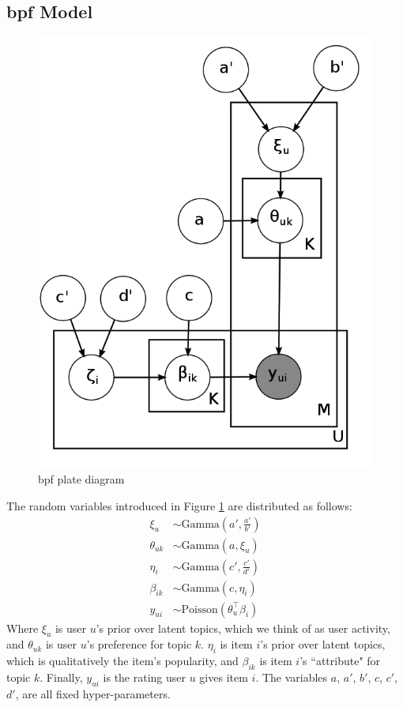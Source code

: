 \documentclass{article} %
\begin{document}
\subsection{\acrlong{bpf} Model}

\begin{figure}[h]
\begin{center}
	\includegraphics[scale=0.25]{bpf.png}
\end{center}
\caption{\acrlong{bpf} plate diagram}
\label{fig:bpf-model}
\end{figure}

The random variables introduced in Figure \ref{fig:bpf-model} are distributed as follows:
\begin{align*}
	\xi_u &\sim \mathrm{Gamma}\left( a', \frac{a'}{b'} \right) \\
	\theta_{uk} &\sim \mathrm{Gamma}\left( a, \xi_u \right) \\
	\eta_i &\sim \mathrm{Gamma}\left( c', \frac{c'}{d'} \right) \\
	\beta_{ik} &\sim \mathrm{Gamma}\left( c, \eta_i \right) \\
	y_{ui} &\sim \mathrm{Poisson}\left( \theta^\top_u \beta_i \right )
\end{align*}
Where $\xi_u$ is user $u$'s prior over latent topics, which we think of as user
activity, and $\theta_{uk}$ is user $u$'s preference for topic $k$. $\eta_i$ is
item $i$'s prior over latent topics, which is qualitatively the item's popularity,
and $\beta_{ik}$ is item $i$'s ``attribute" for topic $k$. Finally, $y_{ui}$ is
the rating user $u$ gives item $i$. The variables $a$, $a'$,
$b'$, $c$, $c'$, $d'$, are all fixed hyper-parameters. 
\end{document}
